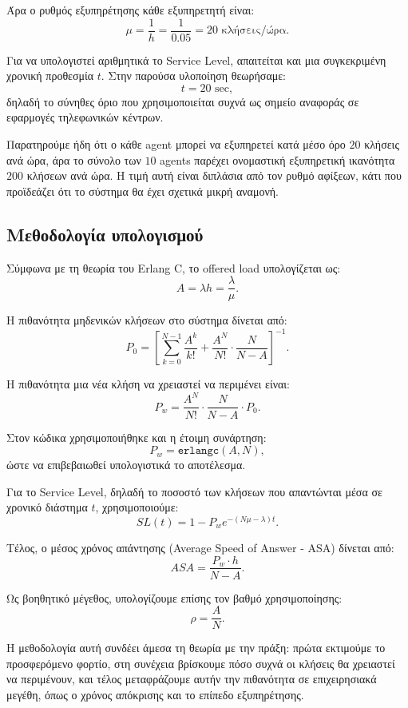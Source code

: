 \documentclass{article}
\begin{document}
Άρα ο ρυθμός εξυπηρέτησης κάθε εξυπηρετητή είναι:
\[
\mu = \frac{1}{h} = \frac{1}{0.05} = 20 \text{ κλήσεις/ώρα}.
\]

Για να υπολογιστεί αριθμητικά το \foreignlanguage{english}{Service Level}, απαιτείται και μια συγκεκριμένη χρονική προθεσμία $t$. Στην παρούσα υλοποίηση θεωρήσαμε:
\[
t = 20 \text{ sec},
\]
δηλαδή το σύνηθες όριο που χρησιμοποιείται συχνά ως σημείο αναφοράς σε εφαρμογές τηλεφωνικών κέντρων.

Παρατηρούμε ήδη ότι ο κάθε agent μπορεί να εξυπηρετεί κατά μέσο όρο $20$ κλήσεις ανά ώρα, άρα το σύνολο των $10$ agents παρέχει ονομαστική εξυπηρετική ικανότητα $200$ κλήσεων ανά ώρα. Η τιμή αυτή είναι διπλάσια από τον ρυθμό αφίξεων, κάτι που προϊδεάζει ότι το σύστημα θα έχει σχετικά μικρή αναμονή.

\subsection{Μεθοδολογία υπολογισμού}

Σύμφωνα με τη θεωρία του Erlang C, το offered load υπολογίζεται ως:
\[
A = \lambda h = \frac{\lambda}{\mu}.
\]

Η πιθανότητα μηδενικών κλήσεων στο σύστημα δίνεται από:
\[
P_0 =
\left[
\sum_{k=0}^{N-1}\frac{A^k}{k!}
+
\frac{A^N}{N!}\cdot\frac{N}{N-A}
\right]^{-1}.
\]

Η πιθανότητα μια νέα κλήση να χρειαστεί να περιμένει είναι:
\[
P_w =
\frac{A^N}{N!}\cdot\frac{N}{N-A}\cdot P_0.
\]

Στον κώδικα χρησιμοποιήθηκε και η έτοιμη συνάρτηση:
\[
P_w = \texttt{erlangc}(A,N),
\]
ώστε να επιβεβαιωθεί υπολογιστικά το αποτέλεσμα.

Για το \foreignlanguage{english}{Service Level}, δηλαδή το ποσοστό των κλήσεων που απαντώνται μέσα σε χρονικό διάστημα $t$, χρησιμοποιούμε:
\[
SL(t) = 1 - P_w e^{-(N\mu-\lambda)t}.
\]

Τέλος, ο μέσος χρόνος απάντησης (\foreignlanguage{english}{Average Speed of Answer - ASA}) δίνεται από:
\[
ASA = \frac{P_w \cdot h}{N-A}.
\]

Ως βοηθητικό μέγεθος, υπολογίζουμε επίσης τον βαθμό χρησιμοποίησης:
\[
\rho = \frac{A}{N}.
\]

Η μεθοδολογία αυτή συνδέει άμεσα τη θεωρία με την πράξη: πρώτα εκτιμούμε το προσφερόμενο φορτίο, στη συνέχεια βρίσκουμε πόσο συχνά οι κλήσεις θα χρειαστεί να περιμένουν, και τέλος μεταφράζουμε αυτήν την πιθανότητα σε επιχειρησιακά μεγέθη, όπως ο χρόνος απόκρισης και το επίπεδο εξυπηρέτησης.
\end{document}
